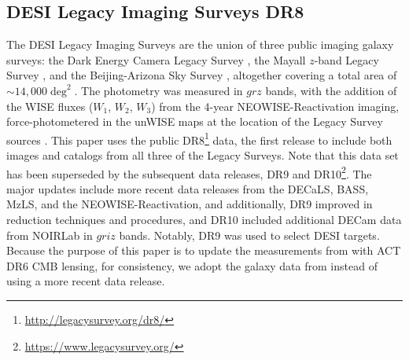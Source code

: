 \documentclass[twocolumn]{aastex631}
\begin{document}
\subsection{DESI Legacy Imaging Surveys DR8}\label{Sec. galaxy}

The DESI Legacy Imaging Surveys \citep{DeyLegacy2019} are the union of three public imaging galaxy surveys: the Dark Energy Camera Legacy Survey \citep[DECaLS;][] {2015AJ....150..150F,2005astro.ph.10346T}, the Mayall $z$-band Legacy Survey \citep[MzLS;][]{2016SPIE.9908E..2CD}, and the Beijing-Arizona Sky Survey \citep[BASS;][]{2004SPIE.5492..787W}, altogether covering a total area of $\sim 14,000 \deg^2$. 
The photometry was measured in $grz$ bands, with the addition of the WISE fluxes ($W_1$, $W_2$, $W_3$) from the 4-year NEOWISE-Reactivation imaging, force-photometered in the unWISE maps at the location of the Legacy Survey sources \citep[][]{Wright2010, Schlafly_2019}.
This paper uses the public DR8\footnote{\url{http://legacysurvey.org/dr8/}} data, the first release to include both images and catalogs from all three of the Legacy Surveys. 
Note that this data set has been superseded by the subsequent data releases, DR9 and DR10\footnote{\url{https://www.legacysurvey.org/}}. The major updates include more recent data releases from the DECaLS, BASS, MzLS, and the NEOWISE-Reactivation, and additionally, DR9 improved in reduction techniques and procedures, and DR10 included additional DECam data from NOIRLab in $griz$ bands. Notably, DR9 was used to select DESI targets.
Because the purpose of this paper is to update the measurements from \cite{hang2021} with ACT DR6 CMB lensing, for consistency, we adopt the galaxy data from \cite{hang2021} instead of using a more recent data release.
\end{document}
